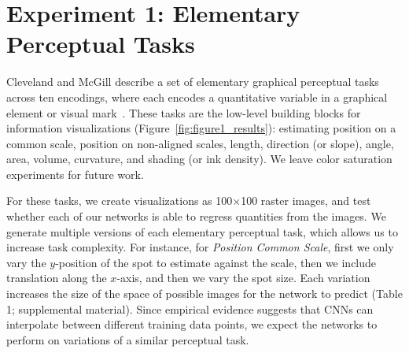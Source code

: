 \section{Experiment 1: Elementary Perceptual Tasks}
\label{sec:elementary}

Cleveland and McGill describe a set of elementary graphical perceptual tasks across ten encodings, where each encodes a quantitative variable in a graphical element or visual mark~\cite{cleveland_mcgill,cleveland1985graphical}. These tasks are the low-level building blocks for information visualizations (Figure~\ref{fig:figure1_results}): %
estimating position on a common scale, position on non-aligned scales, length, direction (or slope), angle, area, volume, curvature, and shading (or ink density). We leave color saturation experiments for future work.

For these tasks, we create visualizations as 100$\times$100 raster images, and test whether each of our networks is able to regress quantities from the images. We generate multiple versions of each elementary perceptual task, which allows us to increase task complexity. For instance, for \emph{Position Common Scale}, first we only vary the $y$-position of the spot to estimate against the scale, then we include translation along the $x$-axis, and then we vary the spot size. Each variation increases the size of the space of possible images for the network to predict (Table 1; supplemental material). Since empirical evidence suggests that CNNs can interpolate between different training data points, we expect the networks to perform on variations of a similar perceptual task.






